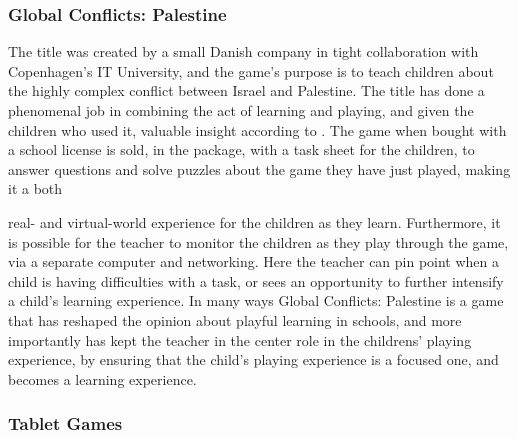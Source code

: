 \subsubsection{Global Conflicts: Palestine}

The title was created by a small Danish company in tight collaboration with Copenhagen's IT University, and the game's purpose is to teach children 
about the highly complex conflict between Israel and Palestine. The title has done a phenomenal job in combining the act of learning and playing, and 
given the children who used it, valuable insight according to \cite{laeringpaaspil}. The game when bought with a school license is sold, in the 
package, with a task sheet for the children, to answer questions and solve puzzles about the game they have just played, making it a both 

real- and virtual-world experience for the children as they learn. Furthermore, it is possible for the teacher to monitor the children as they play 
through the game, via a separate computer and networking. Here the teacher can pin point when a child is having difficulties with a task, or sees an 
opportunity to further intensify a child's learning experience. In many ways Global Conflicts: Palestine is a game that has reshaped the opinion about 
playful learning in schools, and more importantly has kept the teacher in the center role in the childrens' playing experience, by ensuring that the 
child's playing experience is a focused one, and becomes a learning experience.\cite{laeringpaaspil}

\subsubsection{Tablet Games}

